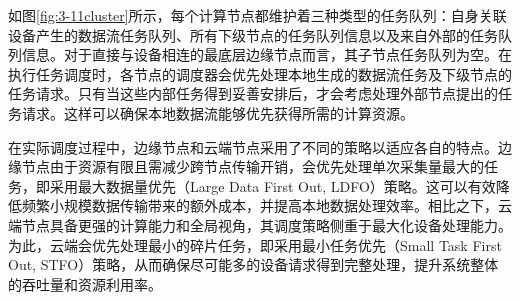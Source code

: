 如图\ref{fig:3-11cluster}所示，每个计算节点都维护着三种类型的任务队列：自身关联设备产生的数据流任务队列、所有下级节点的任务队列信息以及来自外部的任务队列信息。对于直接与设备相连的最底层边缘节点而言，其子节点任务队列为空。在执行任务调度时，各节点的调度器会优先处理本地生成的数据流任务及下级节点的任务请求。只有当这些内部任务得到妥善安排后，才会考虑处理外部节点提出的任务请求。这样可以确保本地数据流能够优先获得所需的计算资源。

在实际调度过程中，边缘节点和云端节点采用了不同的策略以适应各自的特点。边缘节点由于资源有限且需减少跨节点传输开销，会优先处理单次采集量最大的任务，即采用最大数据量优先（Large Data First Out, LDFO）策略。这可以有效降低频繁小规模数据传输带来的额外成本，并提高本地数据处理效率。相比之下，云端节点具备更强的计算能力和全局视角，其调度策略侧重于最大化设备处理能力。为此，云端会优先处理最小的碎片任务，即采用最小任务优先（Small Task First Out, STFO）策略，从而确保尽可能多的设备请求得到完整处理，提升系统整体的吞吐量和资源利用率。

